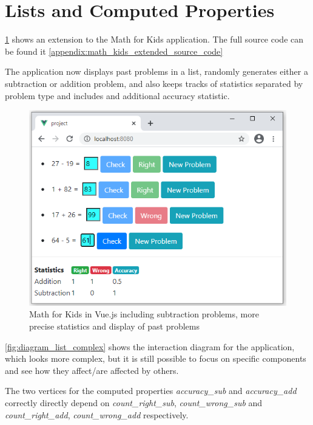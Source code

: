 \section{Lists and Computed Properties}

\ref{fig:eval_image_list_complex} shows an extension to the Math for Kids application. The full source code can be found it \ref{appendix:math_kids_extended_source_code}

The application now displays past problems in a list, randomly generates either a subtraction or addition problem, and also keeps tracks of statistics separated by problem type and includes and additional accuracy statistic.

\begin{figure}[H]
    \includegraphics[width=\textwidth]{images/math_for_kids_own_complex.png}
     \caption{Math for Kids in Vue.js including subtraction problems, more precise statistics and display of past problems }
     \label{fig:eval_image_list_complex}
\end{figure}

\ref{fig:diagram_list_complex} shows the interaction diagram for the application, which looks more complex, but it is still possible to focus on specific components and see how they affect/are affected by others. 

The two vertices for the computed properties \textit{accuracy\_sub} and \textit{accuracy\_add} correctly directly depend on \textit{count\_right\_sub}, \textit{count\_wrong\_sub} and \textit{count\_right\_add}, \textit{count\_wrong\_add} respectively.

